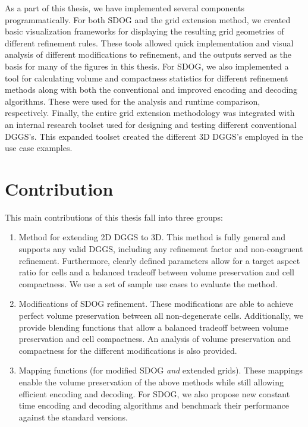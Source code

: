 As a part of this thesis, we have implemented several components programmatically.
For both SDOG and the grid extension method, we created basic visualization frameworks for displaying the resulting grid geometries of different refinement rules.
These tools allowed quick implementation and visual analysis of different modifications to refinement, and the outputs served as the basis for many of the figures in this thesis.
For SDOG, we also implemented a tool for calculating volume and compactness statistics for different refinement methods along with both the conventional and improved encoding and decoding algorithms.
These were used for the analysis and runtime comparison, respectively.
Finally, the entire grid extension methodology was integrated with an internal research toolset used for designing and testing different conventional DGGS's.
This expanded toolset created the different 3D DGGS's employed in the use case examples.


\section{Contribution} \label{chap:1:contribution}
This main contributions of this thesis fall into three groups:

\begin{enumerate}
	\item Method for extending 2D DGGS to 3D.
	This method is fully general and supports any valid DGGS, including any refinement factor and non-congruent refinement.
	Furthermore, clearly defined parameters allow for a target aspect ratio for cells and a balanced tradeoff between volume preservation and cell compactness.
	We use a set of sample use cases to evaluate the method.

	\item Modifications of SDOG refinement.
	These modifications are able to achieve perfect volume preservation between all non-degenerate cells.
	Additionally, we provide blending functions that allow a balanced tradeoff between volume preservation and cell compactness.
	An analysis of volume preservation and compactness for the different modifications is also provided.
		
	\item Mapping functions (for modified SDOG \textit{and} extended grids).
	These mappings enable the volume preservation of the above methods while still allowing efficient encoding and decoding.
	For SDOG, we also propose new constant time encoding and decoding algorithms and benchmark their performance against the standard versions.
\end{enumerate}

